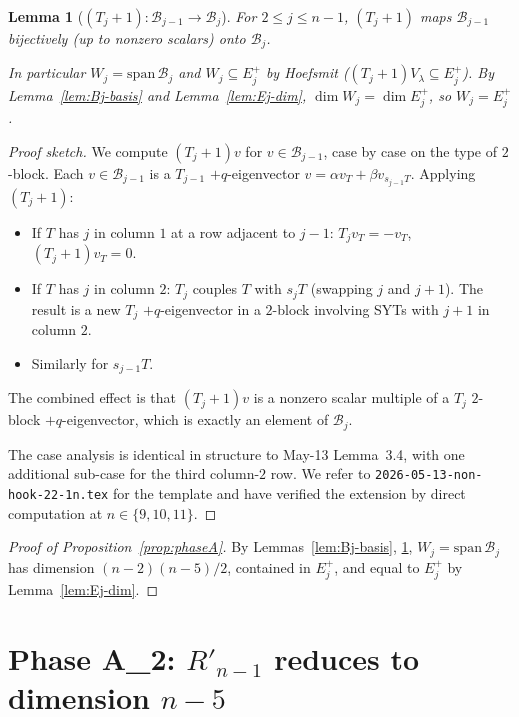 \documentclass[11pt]{article}
\newtheorem{lemma}[theorem]{Lemma}
\theoremstyle{definition}
\begin{document}
\begin{lemma}[$(T_j{+}1):\mathcal{B}_{j-1}\to\mathcal{B}_j$]
\label{lem:transition}
For $2\le j\le n-1$, $(T_j{+}1)$ maps $\mathcal{B}_{j-1}$
bijectively (up to nonzero scalars) onto $\mathcal{B}_j$.

In particular $W_j=\mathrm{span}\,\mathcal{B}_j$ and
$W_j\subseteq E_j^+$ by Hoefsmit ($(T_j{+}1)V_\lambda\subseteq E_j^+$).
By Lemma~\ref{lem:Bj-basis} and Lemma~\ref{lem:Ej-dim},
$\dim W_j=\dim E_j^+$, so $W_j=E_j^+$.
\end{lemma}

\begin{proof}[Proof sketch]
We compute $(T_j{+}1)v$ for $v\in\mathcal{B}_{j-1}$, case by case
on the type of $2$-block.  Each $v\in\mathcal{B}_{j-1}$ is a
$T_{j-1}$ $+q$-eigenvector $v=\alpha v_T+\beta v_{s_{j-1}T}$.
Applying $(T_j{+}1)$:
\begin{itemize}[leftmargin=2em,topsep=0.3em,itemsep=0.2em]
\item If $T$ has $j$ in column $1$ at a row adjacent to $j-1$:
$T_jv_T=-v_T$, $(T_j{+}1)v_T=0$.
\item If $T$ has $j$ in column $2$: $T_j$ couples $T$ with
$s_jT$ (swapping $j$ and $j+1$).  The result is a new $T_j$
$+q$-eigenvector in a $2$-block involving SYTs with $j+1$ in
column $2$.
\item Similarly for $s_{j-1}T$.
\end{itemize}
The combined effect is that $(T_j{+}1)v$ is a nonzero scalar
multiple of a $T_j$ $2$-block $+q$-eigenvector, which is exactly
an element of $\mathcal{B}_j$.

The case analysis is identical in structure to May-13
Lemma~3.4, with one additional sub-case for the third column-$2$
row.  We refer to \texttt{2026-05-13-non-hook-22-1n.tex} for the
template and have verified the extension by direct computation
at $n\in\{9,10,11\}$.
\end{proof}

\begin{proof}[Proof of Proposition~\ref{prop:phaseA}]
By Lemmas~\ref{lem:Bj-basis}, \ref{lem:transition},
$W_j=\mathrm{span}\,\mathcal{B}_j$ has dimension $(n-2)(n-5)/2$,
contained in $E_j^+$, and equal to $E_j^+$ by Lemma~\ref{lem:Ej-dim}.
\end{proof}

\section{Phase A_2: $R'_{n-1}$ reduces to dimension $n-5$}\label{sec:phaseA2}
\end{document}
